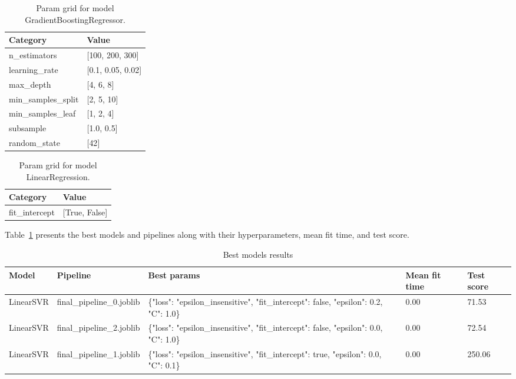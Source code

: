 \documentclass{article}%
\begin{document}
%


\begin{table}[H]%
\begin{center}%
\renewcommand{\arraystretch}{1.5}%
\begin{tabular}{l l}%
\hline%
\textbf{Category}&\textbf{Value}\\%
\hline%
n\_estimators&{[}100, 200, 300{]}\\%
learning\_rate&{[}0.1, 0.05, 0.02{]}\\%
max\_depth&{[}4, 6, 8{]}\\%
min\_samples\_split&{[}2, 5, 10{]}\\%
min\_samples\_leaf&{[}1, 2, 4{]}\\%
subsample&{[}1.0, 0.5{]}\\%
random\_state&{[}42{]}\\%
\hline%
\end{tabular}%
\end{center}%
\caption{Param grid for model GradientBoostingRegressor.}%
\end{table}

%


\begin{table}[H]%
\begin{center}%
\renewcommand{\arraystretch}{1.5}%
\begin{tabular}{l l}%
\hline%
\textbf{Category}&\textbf{Value}\\%
\hline%
fit\_intercept&{[}True, False{]}\\%
\hline%
\end{tabular}%
\end{center}%
\caption{Param grid for model LinearRegression.}%
\end{table}

%
Table~\ref{tab:best_models_results} %
presents the best models and pipelines along with their hyperparameters, mean fit time, and test score.%


\begin{table}[H]%
\begin{center}%
\renewcommand{\arraystretch}{1.5}%
\begin{tabular}{p{35mm} p{35mm} p{45mm} p{25mm} p{15mm}}%
\hline%
\textbf{Model}&\textbf{Pipeline}&\textbf{Best params}&\textbf{Mean fit time}&\textbf{Test score}\\%
\hline%
LinearSVR&final\_pipeline\_0.joblib&\{"loss": "epsilon\_insensitive", "fit\_intercept": false, "epsilon": 0.2, "C": 1.0\}&0.00&71.53\\%
LinearSVR&final\_pipeline\_2.joblib&\{"loss": "epsilon\_insensitive", "fit\_intercept": false, "epsilon": 0.0, "C": 1.0\}&0.00&72.54\\%
LinearSVR&final\_pipeline\_1.joblib&\{"loss": "epsilon\_insensitive", "fit\_intercept": true, "epsilon": 0.0, "C": 0.1\}&0.00&250.06\\%
\hline%
\end{tabular}%
\end{center}%
\caption{Best models results}%
\label{tab:best_models_results}%
\end{table}

%
\end{document}
